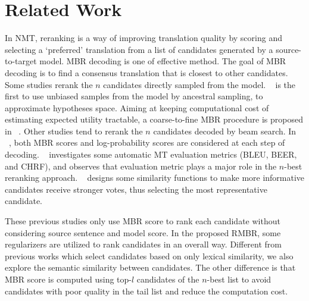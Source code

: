 \documentclass{article}
\begin{document}
\begin{table}
\centering
{}
\caption{Comparison results of inference time. Reranking uses $n=30$ candidates per sample.}
\label{table4}
\end{table}

\section{Related Work}
In NMT, reranking is a way of improving translation quality by scoring and selecting a ‘preferred’ translation from a list of candidates generated by a source-to-target model. MBR decoding is one of effective method. The goal of MBR decoding is to find a consensus translation that is closest to other candidates. Some studies rerank the $n$ candidates directly sampled from the model. \citeauthor{30}~ is the first to use unbiased samples from the model by ancestral sampling, to approximate hypotheses space. Aiming at keeping computational cost of estimating expected utility tractable, a coarse-to-fine MBR procedure is proposed in \citeauthor{31}~. Other studies tend to rerank the $n$ candidates decoded by beam search. In \citeauthor{14}~, both MBR scores and log-probability scores are considered at each step of decoding. \citeauthor{20}~ investigates some automatic MT evaluation metrics (BLEU, BEER, and CHRF), and observes that evaluation metric plays a major role in the $n$-best reranking approach. \citeauthor{29}~ designs some similarity functions to make more informative candidates receive stronger votes, thus selecting the most representative candidate. 

These previous studies only use MBR score to rank each candidate without considering source sentence and model score. In the proposed RMBR, some regularizers are utilized to rank candidates in an overall way. Different from previous works which select candidates based on only lexical similarity, we also explore the semantic similarity between candidates. The other difference is that MBR score is computed using top-$l$ candidates of the $n$-best list to avoid candidates with poor quality in the tail list and reduce the computation cost. 
\end{document}
